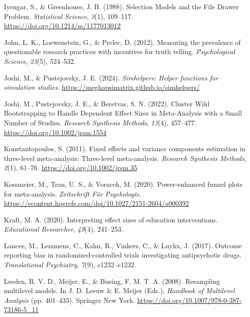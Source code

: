 \documentclass[
  american,
  man, donotrepeattitle,floatsintext]{apa7}
\newlength{\cslhangindent}
\newenvironment{CSLReferences}[2] %
 {\begin{list}{}{%
  \setlength{\itemindent}{0pt}
  \setlength{\leftmargin}{0pt}
  \setlength{\parsep}{0pt}
  \ifodd #1
   \setlength{\leftmargin}{\cslhangindent}
   \setlength{\itemindent}{-1\cslhangindent}
  \fi
  \setlength{\itemsep}{#2\baselineskip}}}
 {\end{list}}
\begin{document}
\begin{CSLReferences}{1}{0}
Iyengar, S., \& Greenhouse, J. B. (1988). Selection {Models} and the {File} {Drawer} {Problem}. \emph{Statistical Science}, \emph{3}(1), 109--117. \url{https://doi.org/10.1214/ss/1177013012}

John, L. K., Loewenstein, G., \& Prelec, D. (2012). Measuring the prevalence of questionable research practices with incentives for truth telling. \emph{Psychological Science}, \emph{23}(5), 524--532.

Joshi, M., \& Pustejovsky, J. E. (2024). \emph{Simhelpers: Helper functions for simulation studies}. \url{https://meghapsimatrix.github.io/simhelpers/}

Joshi, M., Pustejovsky, J. E., \& Beretvas, S. N. (2022). Cluster Wild Bootstrapping to Handle Dependent Effect Sizes in Meta-Analysis with a Small Number of Studies. \emph{Research Synthesis Methods}, \emph{13}(4), 457--477. \url{https://doi.org/10.1002/jrsm.1554}

Konstantopoulos, S. (2011). Fixed effects and variance components estimation in three-level meta-analysis: {Three}-level meta-analysis. \emph{Research Synthesis Methods}, \emph{2}(1), 61--76. \url{https://doi.org/10.1002/jrsm.35}

Kossmeier, M., Tran, U. S., \& Voracek, M. (2020). Power-enhanced funnel plots for meta-analysis. \emph{Zeitschrift Für Psychologie}. \url{https://econtent.hogrefe.com/doi/10.1027/2151-2604/a000392}

Kraft, M. A. (2020). Interpreting effect sizes of education interventions. \emph{Educational Researcher}, \emph{49}(4), 241--253.

Lancee, M., Lemmens, C., Kahn, R., Vinkers, C., \& Luykx, J. (2017). Outcome reporting bias in randomized-controlled trials investigating antipsychotic drugs. \emph{Translational Psychiatry}, \emph{7}(9), e1232--e1232.

Leeden, R. V. D., Meijer, E., \& Busing, F. M. T. A. (2008). Resampling multilevel models. In J. D. Leeuw \& E. Meijer (Eds.), \emph{Handbook of {Multilevel} {Analysis}} (pp. 401--433). Springer New York. \url{https://doi.org/10.1007/978-0-387-73186-5_11}


\end{CSLReferences}
\end{document}
